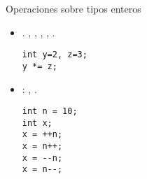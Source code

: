 \begin{frame}[fragile,t]{Operaciones sobre tipos enteros}
\begin{itemize}
  \item {}.
    \cppkey{+=}, \cppkey{-=}, \cppkey{*=}, \cppkey{/=}, \cppkey{\%=}.
\begin{lstlisting}
int y=2, z=3;
y *= z;
\end{lstlisting}

  \item {}: \cppkey{++}, \cppkey{-{}-}.
\begin{lstlisting}
int n = 10;
int x;
x = ++n;
x = n++;
x = --n;
x = n--;
\end{lstlisting}
\end{itemize}
\end{frame}


